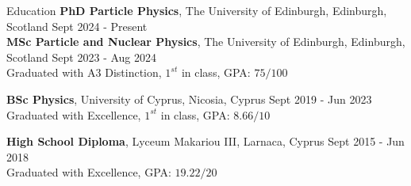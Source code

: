 \documentclass{resume} %
\begin{document}
        \begin{rSection}{Education}
                {\bf PhD Particle Physics}, The University of Edinburgh, Edinburgh, Scotland \hfill {Sept 2024 - Present}\\

                {\bf MSc Particle and Nuclear Physics}, The University of Edinburgh, Edinburgh, Scotland \hfill {Sept 2023 - Aug 2024}\\
                Graduated with A3 Distinction, $1^{st}$ in class, GPA: $75/100$
                
                {\bf BSc Physics}, University of Cyprus, Nicosia, Cyprus \hfill {Sept 2019 - Jun 2023}\\
                Graduated with Excellence, $1^{st}$ in class, GPA: $8.66/10$
                
                {\bf High School Diploma}, Lyceum Makariou III, Larnaca, Cyprus \hfill {Sept 2015 - Jun 2018}\\
        Graduated with Excellence, GPA: $19.22/20$
        \end{rSection}

        \bigbreak
\end{document}

